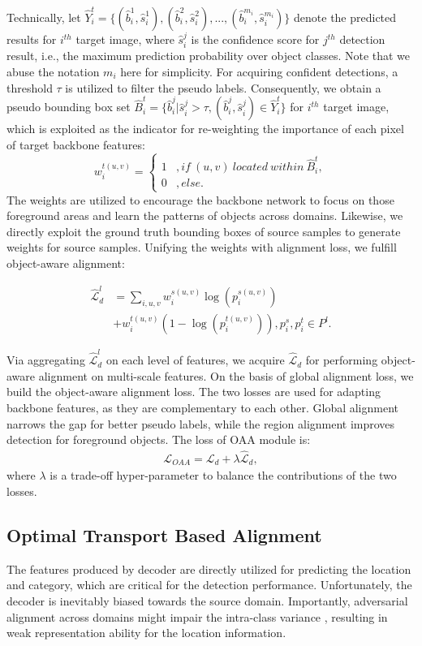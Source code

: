 \documentclass[sigconf]{acmart}
\begin{document}
Technically, let $ \hat{Y}_i^t = \{(\hat{b}_i^1, \hat{s}_i^1), (\hat{b}_i^2, \hat{s}_i^2), ..., (\hat{b}_i^{m_i}, \hat{s}_i^{m_i})\}$ denote the predicted results for $i^{th}$ target image, where $\hat{s}_i^j$ is the confidence score for $j^{th}$ detection result, i.e., the maximum prediction probability over object classes. Note that we abuse the notation $m_i$ here for simplicity. For acquiring confident detections, a threshold $\tau$ is utilized to filter the pseudo labels. Consequently, we obtain a pseudo bounding box set $\hat{B}^t_i = \{\hat{b}_i^j | \hat{s}_i^j  > \tau, (\hat{b}_i^j, \hat{s}_i^j) \in \hat{Y}_i^t \}$ for $i^{th}$ target image, which is exploited as the indicator for re-weighting the importance of each pixel of target backbone features:
$$ w^{t(u,v)}_i = \left\{
\begin{aligned}
  1&, if \ (u,v) \ located \ within \ \hat{B}^t_i, \\
  0&, else.
\end{aligned}
\right.
$$
The weights are utilized to encourage the backbone network to focus on those foreground areas and learn the patterns of objects across domains.
Likewise, we directly exploit the ground truth bounding boxes of source samples to generate weights for source samples.
Unifying the weights with alignment loss, we fulfill object-aware alignment: 

\begin{align}
    \hat{\mathcal{L}}_{d}^{l} &= \mathop{\sum}_{i,u,v} w^{s(u,v)}_{i}  \log (p_i^{s(u,v)}) \\ \nonumber
    &+ w^{t(u,v)}_{i} ( 1-  \log (p_i^{t(u,v)}) ), p_i^s,p_i^t \in P^l. 
\end{align}

Via aggregating $\hat{\mathcal{L}}_{d}^{l}$ on each level of features, we acquire $\hat{\mathcal{L}}_{d}$ for performing object-aware alignment on multi-scale features. On the basis of global alignment loss, we build the object-aware alignment loss. The two losses are used for adapting backbone features, as they are complementary to each other. Global alignment narrows the gap for better pseudo labels, while the region alignment improves detection for foreground objects. The loss of OAA module is:
\begin{align}
    \mathcal{L}_{OAA} = \mathcal{L}_d + \lambda \hat{\mathcal{L}}_d,
\end{align}where $\lambda$ is a trade-off hyper-parameter to balance the contributions of the two losses.

\subsection{Optimal Transport Based Alignment}
The features produced by decoder are directly utilized for predicting the location and category, which are critical for the detection performance. Unfortunately, the decoder is inevitably biased towards the source domain. Importantly, adversarial alignment across domains might impair the intra-class variance \cite{bsp}, resulting in weak representation ability for the location information.
\end{document}

